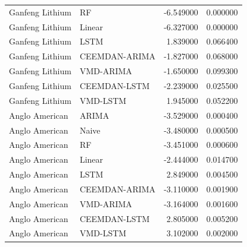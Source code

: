 \begin{longtable}{llrr}
Ganfeng Lithium & RF & -6.549000 & 0.000000 \\
Ganfeng Lithium & Linear & -6.327000 & 0.000000 \\
Ganfeng Lithium & LSTM & 1.839000 & 0.066400 \\
Ganfeng Lithium & CEEMDAN-ARIMA & -1.827000 & 0.068000 \\
Ganfeng Lithium & VMD-ARIMA & -1.650000 & 0.099300 \\
Ganfeng Lithium & CEEMDAN-LSTM & -2.239000 & 0.025500 \\
Ganfeng Lithium & VMD-LSTM & 1.945000 & 0.052200 \\
Anglo American & ARIMA & -3.529000 & 0.000400 \\
Anglo American & Naive & -3.480000 & 0.000500 \\
Anglo American & RF & -3.451000 & 0.000600 \\
Anglo American & Linear & -2.444000 & 0.014700 \\
Anglo American & LSTM & 2.849000 & 0.004500 \\
Anglo American & CEEMDAN-ARIMA & -3.110000 & 0.001900 \\
Anglo American & VMD-ARIMA & -3.164000 & 0.001600 \\
Anglo American & CEEMDAN-LSTM & 2.805000 & 0.005200 \\
Anglo American & VMD-LSTM & 3.102000 & 0.002000 \\
\end{longtable}
